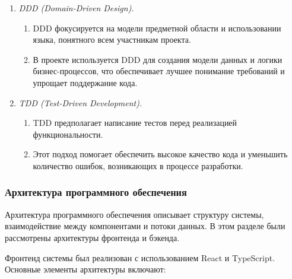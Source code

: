 \begin{enumerate}
    \item \textit{DDD (Domain-Driven Design).}
    \begin{enumerate}
        \item DDD фокусируется на модели предметной области и использовании языка, понятного всем участникам проекта.
        \item В проекте используется DDD для создания модели данных и логики бизнес-процессов, что обеспечивает лучшее понимание требований и упрощает поддержание кода.
    \end{enumerate}
    \item \textit{TDD (Test-Driven Development).}
    \begin{enumerate}
        \item TDD предполагает написание тестов перед реализацией функциональности.
        \item Этот подход помогает обеспечить высокое качество кода и уменьшить количество ошибок, возникающих в процессе разработки.
    \end{enumerate}
\end{enumerate}

\subsubsection{Архитектура программного обеспечения}

Архитектура программного обеспечения описывает структуру системы, взаимодействие между компонентами и потоки данных. В этом разделе были рассмотрены архитектуры фронтенда и бэкенда.

Фронтенд системы был реализован с использованием React и TypeScript. Основные элементы архитектуры включают:

